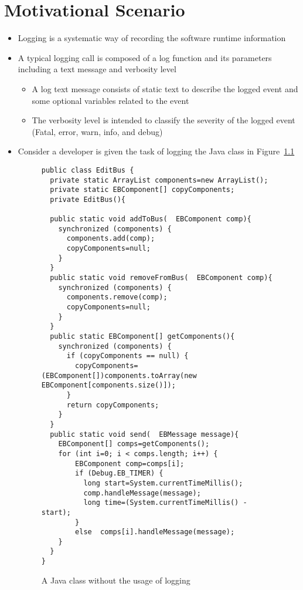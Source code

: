 \chapter{Motivational Scenario}  \label{ch2}
\begin{itemize} [leftmargin=.01in]
\item Logging is a systematic way of recording the software runtime information
\item A typical logging call is composed of a log function and its parameters including a text message and verbosity level
\begin{itemize} [leftmargin=.3in]
\item A log text message consists of static text to describe the logged event
and some optional variables related to the event
\item The verbosity level is intended to classify the
severity of the logged event (Fatal, error, warn, info, and debug)
\end{itemize}
\item Consider a developer is given the task of logging the Java class in Figure~\ref{ch2-ex1}
\begin{figure}[H]
\def\baselinestretch{1}
\begin{lstlisting}
public class EditBus {
  private static ArrayList components=new ArrayList();
  private static EBComponent[] copyComponents;
  private EditBus(){
  
  public static void addToBus(  EBComponent comp){
    synchronized (components) {
      components.add(comp);
      copyComponents=null;
    }
  }
  public static void removeFromBus(  EBComponent comp){
    synchronized (components) {
      components.remove(comp);
      copyComponents=null;
    }
  }
  public static EBComponent[] getComponents(){
    synchronized (components) {
      if (copyComponents == null) {
        copyComponents=(EBComponent[])components.toArray(new EBComponent[components.size()]);
      }
      return copyComponents;
    }
  }
  public static void send(  EBMessage message){
    EBComponent[] comps=getComponents();
    for (int i=0; i < comps.length; i++) {
        EBComponent comp=comps[i];
        if (Debug.EB_TIMER) {
          long start=System.currentTimeMillis();
          comp.handleMessage(message);
          long time=(System.currentTimeMillis() - start);
        }
        else  comps[i].handleMessage(message);
    }
  }
}
\end{lstlisting}
\caption{A Java class without the usage of logging\label{ch2-ex1}}
\end{figure}


\end{itemize}
